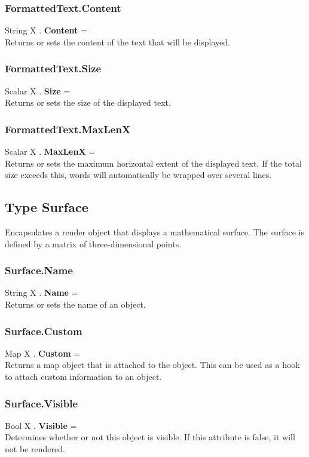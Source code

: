 \documentclass[10pt]{book}
\begin{document}
\subsubsection{FormattedText.Content \label{F:FormattedText:Content}}
String X . \textbf{Content} = \\
Returns or sets the content of the text that will be displayed.

\subsubsection{FormattedText.Size \label{F:FormattedText:Size}}
Scalar X . \textbf{Size} = \\
Returns or sets the size of the displayed text.

\subsubsection{FormattedText.MaxLenX \label{F:FormattedText:MaxLenX}}
Scalar X . \textbf{MaxLenX} = \\
Returns or sets the maximum horizontal extent of the displayed text. If the total size exceeds this, words will automatically be wrapped over several lines.

\subsection{Type Surface \label{T:Surface}}
Encapsulates a render object that displays a mathematical surface. The surface is defined by a matrix of three-dimensional points.

\subsubsection{Surface.Name \label{F:Surface:Name}}
String X . \textbf{Name} = \\
Returns or sets the name of an object.

\subsubsection{Surface.Custom \label{F:Surface:Custom}}
Map X . \textbf{Custom} = \\
Returns a map object that is attached to the object. This can be used as a hook to attach custom information to an object.


\subsubsection{Surface.Visible \label{F:Surface:Visible}}
Bool X . \textbf{Visible} = \\
Determines whether or not this object is visible. If this attribute is false, it will not be rendered.
\end{document}
